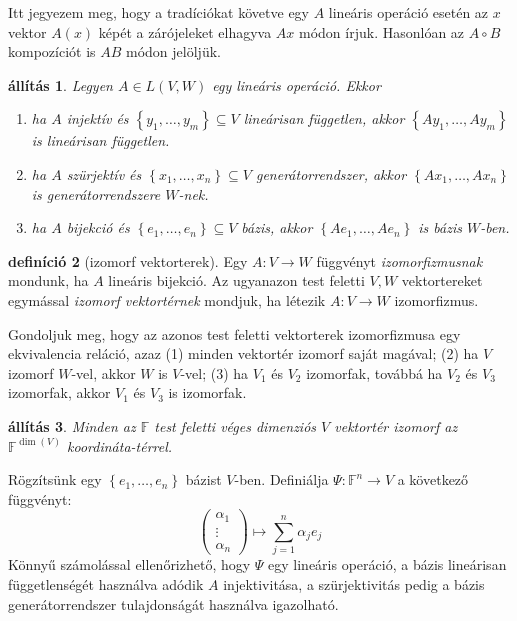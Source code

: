 \documentclass[9pt, a4paper, showtrims]{memoir}
\makeatletter
\renewenvironment{proof}[1][\proofname]
    {\par\pushQED{\qed}%
    \normalfont \topsep6\p@\@plus6\p@\relax
    \trivlist
    \item[\hskip\labelsep
        \itshape
    #1\@addpunct{:}]\ignorespaces}
    {\popQED\endtrivlist\@endpefalse}
\theoremstyle{plain}
\newtheorem{proposition}{állítás}[chapter]
\theoremstyle{remark}
\theoremstyle{definition}
\newtheorem{definition}[proposition]{definíció}
\makeatother
\begin{document}
Itt jegyezem meg, hogy a tradíciókat követve egy $A$ lineáris operáció esetén az $x$ vektor
$A\left( x \right)$ képét a zárójeleket elhagyva $Ax$ módon írjuk.
Hasonlóan az $A\circ B$ kompozíciót is $AB$ módon jelöljük.

\begin{proposition}
	Legyen $A\in L\left( V,W \right)$ egy lineáris operáció.
	Ekkor
	\begin{enumerate}
		\item ha $A$ injektív és $\left\{ y_1,\ldots,y_m \right\}\subseteq V$
		      lineárisan független,
		      akkor
		      $\left\{ Ay_1,\ldots,Ay_m \right\}$ is lineárisan független.
		\item ha $A$ szürjektív és $\left\{ x_1,\ldots,x_n \right\}\subseteq V$
		      generátorrendszer,
		      akkor
		      $\left\{ Ax_1,\ldots,Ax_n \right\}$ is generátorrendszere $W$-nek.
		\item ha $A$ bijekció és $\left\{ e_1,\ldots,e_n \right\}\subseteq V$
		      bázis,
		      akkor
		      $\left\{ Ae_1,\ldots,Ae_n \right\}$ is bázis $W$-ben.
		      \qedhere
	\end{enumerate}
\end{proposition}
\begin{definition}[izomorf vektorterek]
	Egy $A:V\to W$ függvényt \emph{izomorfizmusnak} mondunk,
	ha $A$ lineáris bijekció.
	Az ugyanazon test feletti $V,W$ vektortereket egymással \emph{izomorf vektortérnek} mondjuk,
	ha létezik $A:V\to W$ izomorfizmus.
\end{definition}
Gondoljuk meg, hogy az azonos test feletti vektorterek izomorfizmusa egy ekvivalencia reláció,
azaz (1) minden vektortér izomorf saját magával; (2) ha $V$ izomorf $W$-vel,
akkor $W$ is $V$-vel; (3) ha $V_1$ és $V_2$ izomorfak, továbbá ha $V_2$ és $V_3$ izomorfak, akkor
$V_1$ és $V_3$ is izomorfak.
\begin{proposition}
	Minden az $\mathbb{F}$ test feletti véges dimenziós $V$ vektortér izomorf az $\mathbb{F}^{\dim(V)}$
	koordináta-térrel.
\end{proposition}
\begin{proof}
	Rögzítsünk egy $\left\{ e_1,\ldots,e_n \right\}$ bázist $V$-ben.
	Definiálja $\Psi:\mathbb{F}^n\to V$ a következő függvényt:
	\[
		\begin{pmatrix}
			\alpha_1 \\ \vdots\\ \alpha_n
		\end{pmatrix}
		\mapsto\sum_{j=1}^n\alpha_je_j
	\]
	Könnyű számolással ellenőrizhető,
	hogy $\Psi$ egy lineáris operáció,
	a bázis lineárisan függetlenségét használva adódik $A$ injektivitása,
	a szürjektivitás pedig a bázis generátorrendszer tulajdonságát használva igazolható.
\end{proof}
\end{document}
